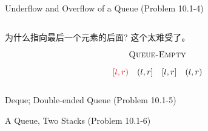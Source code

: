 
\begin{frame}{}
  \begin{columns}
      \pause
  \end{columns}

  \pause
  \vspace{0.60cm}
  \centerline{}
\end{frame}

\begin{frame}{}
  \begin{exampleblock}{Underflow and Overflow of a Queue (Problem 10.1-4)}
  \end{exampleblock}

  \begin{columns}
  \end{columns}
\end{frame}

\begin{frame}{}

  \begin{CJK*}{UTF8}{gbsn}
    \centerline{  为什么指向最后一个元素的后面? 这个太难受了。}
  \end{CJK*}

  \pause
  \[
    \textsc{Queue-Empty}
  \]
\end{frame}

\begin{frame}{}
  \[
    \textcolor{red}{[l, r)}\quad (l, r]\quad [l, r]\quad (l, r)
  \]

  \pause
  \begin{columns}
      \centerline{}
  \end{columns}
\end{frame}

\begin{frame}{}
  \begin{exampleblock}{Deque; Double-ended Queue (Problem 10.1-5)}
  \end{exampleblock}
\end{frame}

\begin{frame}{}
  \begin{exampleblock}{A Queue, Two Stacks (Problem 10.1-6)}
  \end{exampleblock}
\end{frame}
